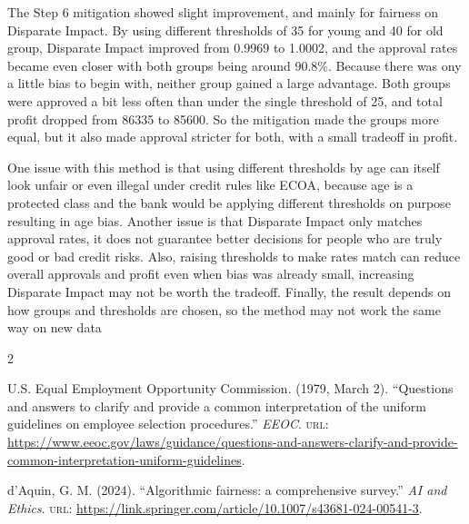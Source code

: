 \documentclass[
	letterpaper, %
]{jdf}
\begin{document}
    The Step 6 mitigation showed slight improvement, and mainly for fairness on Disparate Impact. By using different thresholds of 35 for young and 40 for old group, Disparate Impact improved from 0.9969 to 1.0002, and the approval rates became even closer with both groups being around 90.8\%. Because there was ony a little bias to begin with, neither group gained a large advantage. Both groups were approved a bit less often than under the single threshold of 25, and total profit dropped from 86335 to 85600. So the mitigation made the groups more equal, but it also made approval stricter for both, with a small tradeoff in profit.

    One issue with this method is that using different thresholds by age can itself look unfair or even illegal under credit rules like ECOA, because age is a protected class and the bank would be applying different thresholds on purpose resulting in age bias. Another issue is that Disparate Impact only matches approval rates, it does not guarantee better decisions for people who are truly good or bad credit risks. Also, raising thresholds to make rates match can reduce overall approvals and profit even when bias was already small, increasing Disparate Impact may not be worth the tradeoff. Finally, the result depends on how groups and thresholds are chosen, so the method may not work the same way on new data


\begin{thebibliography}{2}

U.S. Equal Employment Opportunity Commission. (1979, March 2). ``Questions and answers to clarify and provide a common interpretation of the uniform guidelines on employee selection procedures.'' \textit{EEOC}. 
\textsc{url}: \url{https://www.eeoc.gov/laws/guidance/questions-and-answers-clarify-and-provide-common-interpretation-uniform-guidelines}.

d'Aquin, G. M. (2024). ``Algorithmic fairness: a comprehensive survey.'' \textit{AI and Ethics}. 
\textsc{url}: \url{https://link.springer.com/article/10.1007/s43681-024-00541-3}.

\end{thebibliography}
\printbibliography[heading=none]
\end{document}
